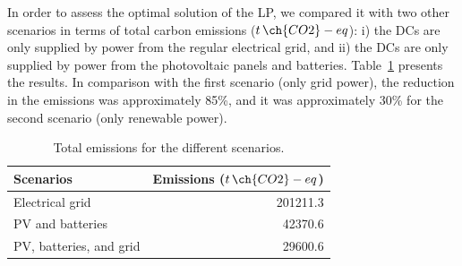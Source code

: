 

In order to assess the optimal solution of the LP, we compared it with two other scenarios in terms of total carbon emissions ($t\,\ch{CO2}-eq$): i) the DCs are only supplied by power from the regular electrical grid, and ii) the DCs are only supplied by power from the photovoltaic panels and batteries. Table~\ref{tab:emissions} presents the results. In comparison with the first scenario (only grid power), the reduction in the  emissions was approximately 85\%, and it was approximately 30\% for the second scenario (only renewable power).



\begin{table}[!ht]
\caption{Total emissions for the different scenarios.}\label{tab:emissions} \centering
\begin{tabular}{|p{5cm}|r|}
  \hline
  \textbf{Scenarios} & \textbf{Emissions ($t\,\ch{CO2}-eq$)}   \\
  \hline
  Electrical grid                    & 201211.3    \\
  \hline
  PV and batteries  &                  42370.6 \\ %
  \hline
  PV, batteries, and grid            &  29600.6   \\
  \hline


\end{tabular}
\end{table}

